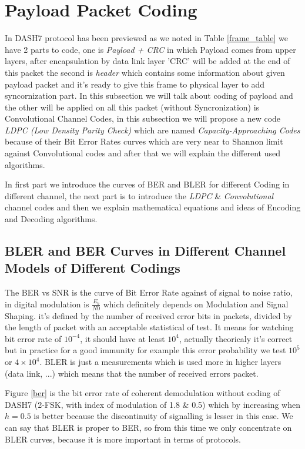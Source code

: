 \section{Payload Packet Coding}
In DASH7 protocol has been previewed as we noted in Table \ref{frame_table} we have 2 parts to code, one is \textit{Payload + CRC} in which Payload comes from upper layers, after encapsulation by data link layer 'CRC' will be added at the end of this packet the second is \textit{header} which contains some information about given payload packet and it's ready to give this frame to physical layer to add syncornization part. In this subsection we will talk about coding of payload and the other will be applied on all this packet (without Syncronization) is Convolutional Channel Codes, in this subsection we will propose a new code \textit{LDPC (Low Density Parity Check)} which are named \textit{Capacity-Approaching Codes} because of their Bit Error Rates curves which are very near to Shannon limit against Convolutional codes and after that we will explain the different used algorithms.     

In first part we introduce the curves of BER and BLER for different Coding in different channel, the next part is to introduce the \textit{LDPC} \& \textit{Convolutional} channel codes and then we explain mathematical equations and ideas of Encoding and Decoding algorithms.
  

\subsection{BLER and BER Curves in Different Channel Models of Different Codings}
The BER vs SNR is the curve of Bit Error Rate against of signal to noise ratio, in digital modulation is 
$\frac{E_{b}}{N0}$ which definitely depends on Modulation and Signal Shaping. it's defined by the number of received error bits in packets, divided by the length of packet with an acceptable statistical of test. It means for watching bit error rate of $10^{-4}$, it should have at least $10^{4}$, actually theoricaly it's correct but in practice for a good immunity for example this error probability we test $10^{5}$ or $4 \times 10^{4}$.
BLER is just a measurements which is used more in higher layers (data link, ...) which means that the number of received errors packet.

Figure \ref{ber} is the bit error rate of coherent demodulation without coding of DASH7 (2-FSK, with index of modulation of 1.8 \& 0.5) which by increasing when $h = 0.5$ is better because the discontinuity of signalling is lesser in this case. We can say that BLER is proper to BER, so from this time we only concentrate on BLER curves, because it is more important in terms of protocols.    

